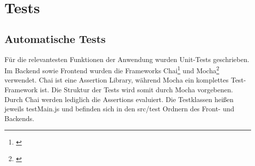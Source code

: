 

\section{Tests}\label{Tests}

\subsection{Automatische Tests}
Für die relevantesten Funktionen der Anwendung wurden Unit-Tests geschrieben.
Im Backend sowie Frontend wurden die Frameworks Chai\footnote{\cite{chai}} und Mocha\footnote{\cite{mocha}} verwendet.
Chai ist eine Assertion Library, während Mocha ein komplettes Test-Framework ist.
Die Struktur der Tests wird somit durch Mocha vorgebenen.
Durch Chai werden lediglich die Assertions evaluiert.
Die Testklassen heißen jeweils testMain.js und befinden sich in den src/test Ordnern des Front- und Backends.

